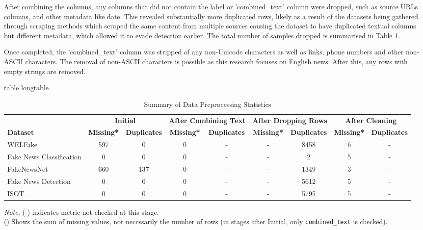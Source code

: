 \documentclass[stu,12pt,floatsintext,donotrepeattitle]{apa7}
\makeatletter
\let\origcaption\caption
\newcommand{\@tabletype}{table}
\newcommand{\@longtabletype}{longtable}
\DeclareRobustCommand{\caption}[2][]{%
    \ifx\relax#1\relax
      \origcaption{#2}%
      \def\temp@cap{#2}%
    \else
      \origcaption[#1]{#2}%
      \def\temp@cap{#1}%
    \fi
    \ifx\@captype\@tabletype
      \ifx\@currenvir\@longtabletype\else
        \addcontentsline{lot}{table}{\protect\numberline{\thetable}{\ignorespaces\temp@cap}}%
      \fi
    \fi
  }%
\let\oldcaption\caption
\renewcommand{\caption}[2][]{%
    \oldcaption[#1]{#2}%
    \vspace{-12pt}%
  }%
\makeatother
\begin{document}
After combining the columns, any columns that did not contain the label or 'combined\_text' column were dropped, such as source URLs columns, and other metadata like date. This revealed substantially more duplicated rows, likely as a result of the datasets being gathered through scraping methods which scraped the same content from multiple sources causing the dataset to have duplicated textual columns but different metadata, which allowed it to evade detection earlier. The total number of samples dropped is summarised in Table \ref{tab:preprocessing_stats}.

Once completed, the 'combined\_text' column was stripped of any non-Unicode characters as well as links, phone numbers and other non-ASCII characters. The removal of non-ASCII characters is possible as this research focuses on English news. After this, any rows with empty strings are removed. 

\vspace{25pt}
\begin{table}[H]
    \centering
    \scriptsize %
    \setlength{\tabcolsep}{3pt} %
    \caption{Summary of Data Preprocessing Statistics}
    \label{tab:preprocessing_stats}
    \begin{tabular}{l cc cc cc cc}
        \toprule
         & \multicolumn{2}{c}{\textbf{Initial}} 
         & \multicolumn{2}{c}{\textbf{After Combining Text}} 
         & \multicolumn{2}{c}{\textbf{After Dropping Rows}} 
         & \multicolumn{2}{c}{\textbf{After Cleaning}} \\
        \cmidrule(lr){2-3} \cmidrule(lr){4-5} \cmidrule(lr){6-7} \cmidrule(lr){8-9}
        \textbf{Dataset} & \textbf{Missing*} & \textbf{Duplicates} & \textbf{Missing*} & \textbf{Duplicates} & \textbf{Missing*} & \textbf{Duplicates} & \textbf{Missing*} & \textbf{Duplicates} \\
        \midrule
        WELFake & 597 & 0 & 0 & - & - & 8458 & 6 & - \\
        Fake News Classification & 0 & 0 & 0 & - & - & 2 & 5 & - \\
        FakeNewsNet & 660 & 137 & 0 & - & - & 1349 & 3 & - \\
        Fake News Detection & 0 & 0 & 0 & - & - & 5612 & 5 & - \\
        ISOT & 0 & 0 & 0 & - & - & 5795 & 5 & - \\
        \bottomrule
    \end{tabular}
    \par\medskip
    \raggedright
    \footnotesize{\textit{Note.} (-) indicates metric not checked at this stage. \\
    (\*) Shows the sum of missing values, not necessarily the number of rows (in stages after Initial, only \texttt{combined\_text} is checked).}
\end{table}
\end{document}
